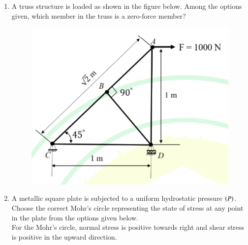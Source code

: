 \documentclass[journal]{IEEEtran}
\begin{document}
\begin{enumerate}[leftmargin=0pt]
\item
A truss structure is loaded as shown in the figure below. Among the options given, which member in the truss is a zero-force member?
\begin{figure}[H]\includegraphics[width=0.5\columnwidth]{Figs/image (99).png}\caption*{}\label{fig:q27}\end{figure}
\vspace{0.2cm}
\begin{enumerate}
\end{enumerate}
\hfill{}

\item
A metallic square plate is subjected to a uniform hydrostatic pressure $\left(P\right)$. Choose the correct Mohr's circle representing the state of stress at any point in the plate from the options given below.\\
For the Mohr's circle, normal stress is positive towards right and shear stress is positive in the upward direction.


\end{enumerate}
\end{document}
